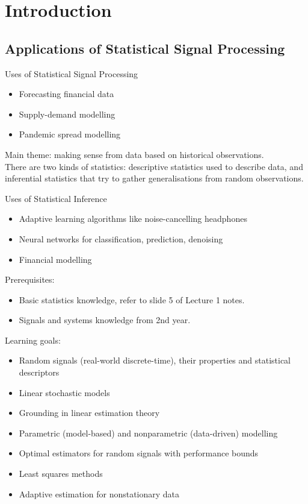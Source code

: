 \chapter{Introduction}


\section{Applications of Statistical Signal Processing}

Uses of Statistical Signal Processing
\begin{itemize}
    \item Forecasting financial data
    \item Supply-demand modelling
    \item Pandemic spread modelling
\end{itemize}

Main theme: making sense from data based on historical observations. \\

There are two kinds of statistics: descriptive statistics used to describe data, and inferential statistics that try to gather generalisations from random observations. 

Uses of Statistical Inference
\begin{itemize}
    \item Adaptive learning algorithms like noise-cancelling headphones
    \item Neural networks for classification, prediction, denoising
    \item Financial modelling
\end{itemize}

Prerequisites:
\begin{itemize}
    \item Basic statistics knowledge, refer to slide 5 of Lecture 1 notes.
    \item Signals and systems knowledge from 2nd year.
\end{itemize}

Learning goals:
\begin{itemize}
    \item Random signals (real-world discrete-time), their properties and statistical descriptors
    \item Linear stochastic models
    \item Grounding in linear estimation theory
    \item Parametric (model-based) and nonparametric (data-driven) modelling
    \item Optimal estimators for random signals with performance bounds
    \item Least squares methods
    \item Adaptive estimation for nonstationary data
\end{itemize}